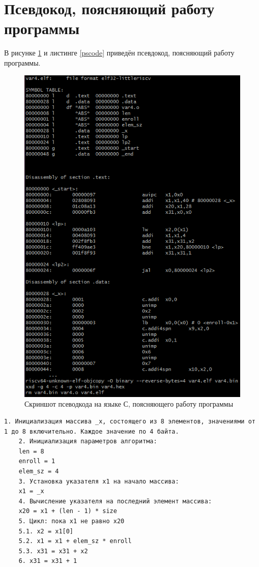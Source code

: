 \section{Псевдокод, поясняющий работу программы}
В рисунке \ref{img:var4pseudocode} и листинге \ref{pscode} приведён псевдокод, поясняющий работу программы.
\begin{figure}[H]
	\begin{center}
		\includegraphics[scale=0.65]{img/var4disassembler.png}
	\end{center}
	\captionsetup{justification=centering}
	\caption{Скриншот псеводкода на языке С, поясняющего работу программы}
	\label{img:var4pseudocode}
\end{figure}

\begin{lstlisting}[extendedchars=\true, keepspaces=true, escapechar=\%,
	texcl=\true, label=pscode,caption=Псевдокод, поясняющий работу программы]
	1. Инициализация массива _x, состоящего из 8 элементов, значениями от 1 до 8 включительно. Каждое значение по 4 байта.
	2. Инициализация параметров алгоритма:
	len = 8
	enroll = 1 
	elem_sz = 4
	3. Установка указателя x1 на начало массива:
	x1 = _x
	4. Вычисление указателя на последний элемент массива:
	x20 = x1 + (len - 1) * size
	5. Цикл: пока x1 не равно x20
	5.1. x2 = x1[0]
	5.2. x1 = x1 + elem_sz * enroll
	5.3. x31 = x31 + x2
	6. x31 = x31 + 1
\end{lstlisting}

